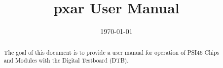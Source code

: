 \documentclass{scrartcl}
\title{pxar User Manual} %
\author{
} %
\date{\today} %
\begin{document}
\maketitle %


\begin{abstract}
The goal of this document is to provide a user manual for operation of
PSI46 Chips and Modules with the Digital Testboard (DTB).
\end{abstract}

\newpage
\tableofcontents

\newpage


\newpage

\newpage

\newpage

\newpage

\newpage


\newpage
\clearpage
{}
\begin{thebibliography}{99}
  
\end{thebibliography}  
\end{document}
